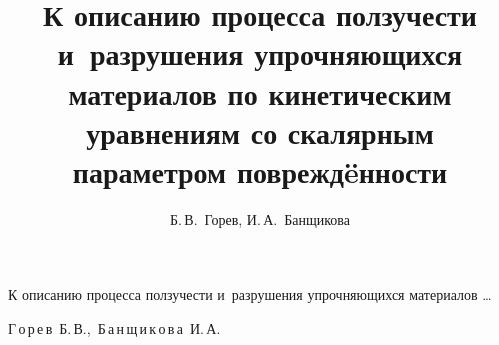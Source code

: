 


%

%


%

%

%





\renewcommand{\firstpage}{90}

\renewcommand{\lastpage}{98}












\title{К описанию процесса ползучести и~разрушения упрочняющихся материалов по кинетическим уравнениям со скалярным параметром поврежд\"eнности}%

{К описанию процесса ползучести и~разрушения упрочняющихся материалов \dots}%



\author{Б.\,В.~Горев, И.\,А.~Банщикова}%

{Г\,о\,р\,е\,в~Б.\,В.,\ Б\,а\,н\,щ\,и\,к\,о\,в\,а~И.\,А.}%












